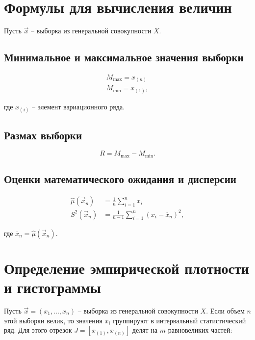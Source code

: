 \documentclass[12pt]{report}
\begin{document}
\section*{Формулы для вычисления величин}

Пусть $\vec x$ -- выборка из генеральной совокупности $X$. 

\subsection*{Минимальное и максимальное значения выборки}
\begin{equation}
	\begin{aligned}
		M_{\max} = x_{(n)}\\
		M_{\min} = x_{(1)},
	\end{aligned}
\end{equation}

где $x_{(i)}$ -- элемент вариационного ряда.

\subsection*{Размах выборки}
\begin{equation}
	R = M_{\max} - M_{\min}.
\end{equation}


\subsection*{Оценки математического ожидания и дисперсии}
\begin{equation}
	\begin{aligned}
		\hat\mu(\vec x_n) &= \frac 1n \sum_{i=1}^n x_i\\
		S^2(\vec x_n) &= \frac 1{n-1} \sum_{i=1}^n (x_i-\overline x_n)^2,
	\end{aligned}
\end{equation}

где $\overline x_n = \hat\mu(\vec x_n)$.

\newpage

\section*{Определение эмпирической плотности и гистограммы}

Пусть $\vec x = (x_1, ..., x_n)$ -- выборка из генеральной совокупности $X$. Если объем $n$ этой выборки велик, то значения $x_i$ группируют в интервальный статистический ряд. Для этого отрезок $J = [x_{(1)}, x_{(n)}]$ делят на $m$ равновеликих частей:
\end{document}
